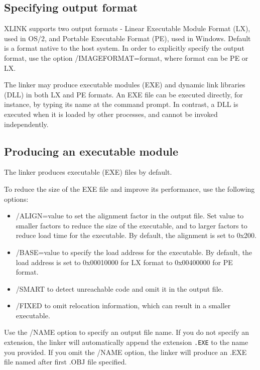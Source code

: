 
\subsection{Specifying output format}

 XLINK supports two output formats - Linear Executable Module Format (LX), used in OS/2,
 and Portable Executable Format (PE), used in Windows.
 Default is a format native to the host system. In order to explicitly specify the output
 format, use the option /IMAGEFORMAT=format, where format can be PE or LX.

 The linker may produce executable modules (EXE) and dynamic link libraries
 (DLL) in both LX and PE formats.
 An EXE file can be executed directly, for instance, by typing its
 name at the command prompt. In contrast, a DLL is executed when
 it is loaded by other processes, and cannot be invoked independently.

\subsection{Producing an executable module}
\label{link:inout:exetype:exe}

 The linker produces executable (EXE) files by default.

 To reduce the size of the EXE file and improve its performance, use the
 following options:


\begin{itemize}
\item /ALIGN=value to set the alignment factor in the output file. Set
       value to smaller factors to reduce the size of the executable, and to
       larger factors to reduce load time for the executable. By default, the
       alignment is set to 0x200.
\item /BASE=value to specify the load address for the executable.
       By default, the load address is set to 0x00010000 for LX format
       to 0x00400000 for PE format.
\item /SMART to detect unreachable code and omit it in the output file.
\item /FIXED to omit relocation information, which can result in a smaller
      executable.
\end{itemize}

  Use the /NAME option to specify an output file name. If you do not specify an
  extension, the linker will automatically append the extension \verb'.EXE' to
  the name you provided. If you omit the /NAME option,
  the linker will produce an .EXE file named after first .OBJ file specified.


